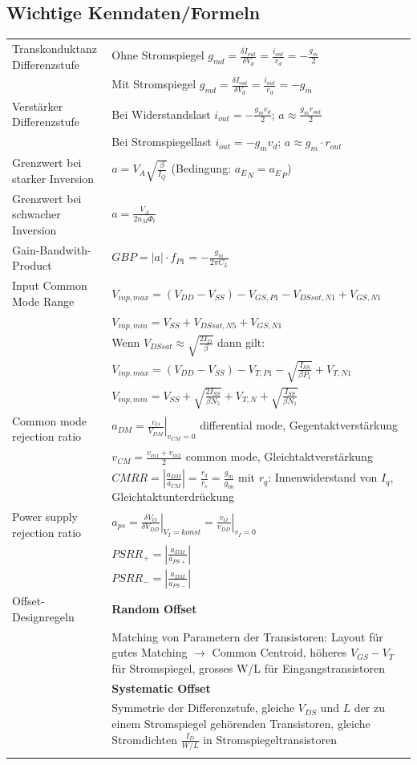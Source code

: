 \subsection{Wichtige Kenndaten/Formeln}
\begin{tabular}{p{}p{}}
	Transkonduktanz Differenzstufe & Ohne Stromspiegel $g_{md}=\frac{\delta I_{out}}{\delta V_d}=\frac{i_{out}}{v_d}=-\frac{g_m}{2}$ \\
	& Mit Stromspiegel $g_{md}=\frac{\delta I_{out}}{\delta V_d}=\frac{i_{out}}{v_d}=-g_m$ \\
	Verstärker Differenzstufe&Bei Widerstandslast $i_{out}=-\frac{g_mv_d}{2}$; $a\approx \frac{g_mr_{out}}{2}$\\
	&Bei Stromspiegellast $i_{out}=-g_mv_d$; $a\approx g_m\cdot r_{out}$\\
	Grenzwert bei starker Inversion& $a=V_A \sqrt{\frac{\beta}{I_Q}}$ (Bedingung: ${a_E}_N = {a_E}_P$)\\
	Grenzwert bei schwacher Inversion& $a=\frac{V_A}{2n_M \Phi_t}$\\
	Gain-Bandwith-Product& $GBP=|a|\cdot f_{P1}=-\frac{g_m}{2\pi C_L}$\\
	Input Common Mode Range&$V_{inp,max}=(V_{DD}-V_{SS})-V_{GS,P1}-V_{DSsat,N1}+V_{GS,N1}$\\
	&$V_{inp,min}=V_{SS}+V_{DSsat,N5}+V_{GS,N1}$\\[2ex]
	&Wenn $V_{DSsat}\approx \sqrt{\frac{2I_D}{\beta}}$ dann gilt:\\
	&$V_{inp,max}=(V_{DD}-V_{SS})-V_{T,P1}-\sqrt{\frac{I_{SS}}{\beta P_1}}+V_{T,N1}$\\
	&$V_{inp,min}=V_{SS}+\sqrt{\frac{2I_{SS}}{\beta N_5}}+V_{T,N}+\sqrt{\frac{I_{SS}}{\beta N_1}}$\\
	Common mode rejection ratio&$a_{DM}=\left.\frac{v_O}{V_{DM}}\right|_{v_{CM}=0}$ differential mode, Gegentaktverstärkung\\
	&$v_{CM}=\frac{v_{in1}+v_{in2}}{2}$ common mode, Gleichtaktverstärkung\\
	&$CMRR=|\frac{a_{DM}}{a_{CM}}|=\frac{r_q}{r_s}=\frac{g_m}{g_{0b}}$ mit $r_q$: Innenwiderstand von $I_q$, Gleichtaktunterdrückung\\
	Power supply rejection ratio& $a_{ps}=\left.\frac{\delta V_O}{\delta V_{DD}}\right|_{V_I=konst}
	=\left.\frac{v_O}{v_{DD}}\right|_{v_I=0}$ \\
	&$PSRR_+=|\frac{a_{DM}}{a_{PS+}}|$\\
	&$PSRR_-=|\frac{a_{DM}}{a_{PS-}}|$\\
	Offset-Designregeln& \textbf{Random Offset}\\
	&Matching von Parametern der Transistoren: Layout für gutes Matching $\rightarrow$ Common Centroid, höheres $V_{GS}-V_T$ für Stromspiegel, grosses W/L für Eingangstransistoren\\
	&\textbf{Systematic Offset}\\
	&Symmetrie der Differenzstufe, gleiche $V_{DS}$ und $L$ der zu einem Stromspiegel gehörenden Transistoren, gleiche Stromdichten $\frac{I_D}{W/L}$ in Stromspiegeltransistoren\\
	& \textbf{}
\end{tabular}